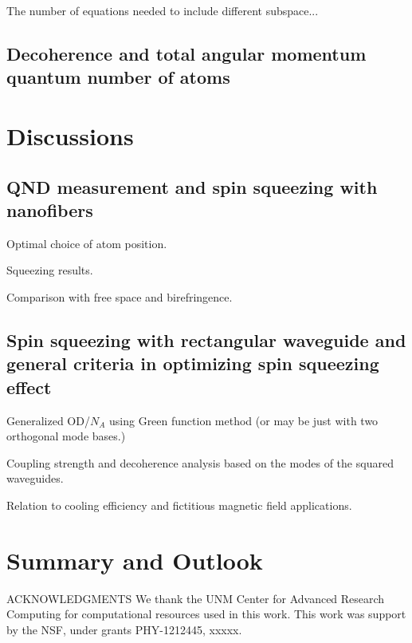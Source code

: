 \documentclass[pra,twocolumn,floatfix,superscriptaddress]{revtex4-1} %
\begin{document}
The number of equations needed to include different subspace...

\subsection{Decoherence and total angular momentum quantum number of atoms}

\section{Discussions} \label{Sec::Discussions}



\subsection{QND measurement and spin squeezing with nanofibers} \label{Sec::Nanofiber}

Optimal choice of atom position.

Squeezing results.

Comparison with free space and birefringence.

\subsection{Spin squeezing with rectangular waveguide and general criteria in optimizing spin squeezing effect} \label{Sec::Waveguide}

Generalized OD/$N_A$ using Green function method (or may be just with two orthogonal mode bases.)

Coupling strength and decoherence analysis based on the modes of the squared waveguides.

Relation to cooling efficiency and fictitious magnetic field applications.

\section{Summary and Outlook} \label{Sec::Conclusion}


ACKNOWLEDGMENTS
We thank the UNM Center for Advanced Research Computing for computational resources used in this work.
This work was support by the NSF, under grants PHY-1212445, xxxxx.

\end{document}

